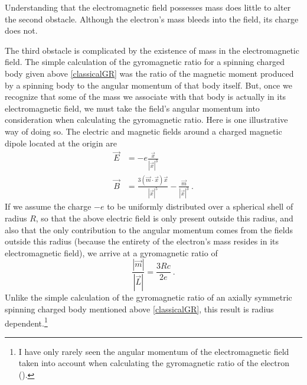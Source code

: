 \documentclass[12pt,secnumarabic,amsmath,amssymb,balancelastpage,nofootinbib]{article}
\begin{document}
Understanding that the electromagnetic field possesses mass does little to alter the second obstacle.  Although the electron's mass bleeds into the field, its charge does not.

The third obstacle is complicated by the existence of mass in the electromagnetic field.  The simple calculation of the gyromagnetic ratio for a spinning charged body given above \eqref{classicalGR} was the ratio of the magnetic moment produced by a spinning body to the angular momentum of that body itself.  But, once we recognize that some of the mass we associate with that body is actually in its electromagnetic field, we must take the field's angular momentum into consideration when calculating the gyromagnetic ratio.  Here is one illustrative way of doing so.  The electric and magnetic fields around a charged magnetic dipole located at the origin are
\begin{align}
\vec{E}&=-e\frac{\vec{x}}{|\vec{x}|^3}
\nonumber
\\
\vec{B}&=\frac{3 (\vec{m}\cdot\vec{x})\vec{x}}{|\vec{x}|^5}-\frac{\vec{m}}{|\vec{x}|^3}\ .
\end{align}
If we assume the charge $-e$ to be uniformly distributed over a spherical shell of radius $R$, so that the above electric field is only present outside this radius, and also that the only contribution to the angular momentum comes from the fields outside this radius (because the entirety of the electron's mass resides in its electromagnetic field), we arrive at a gyromagnetic ratio of
\begin{equation}
\frac{|\vec{m}|}{|\vec{L}|}=\frac{3 R c}{2 e}\ .
\label{fieldGR}
\end{equation}
Unlike the simple calculation of the gyromagnetic ratio of an axially symmetric spinning charged body mentioned above \eqref{classicalGR}, this result is radius dependent.\footnote{I have only rarely seen the angular momentum of the electromagnetic field taken into account when calculating the gyromagnetic ratio of the electron (\citealp{corben1961, giulini2008}).}
\end{document}
